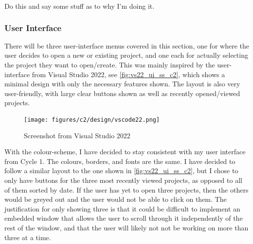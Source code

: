 \documentclass[11pt]{article}
\begin{document}
                Do this and say some stuff as to why I'm doing it.

            \subsubsection{User Interface}


                

                There will be three user-interface menus covered in this section, one for where the user decides to open a new or existing project, and one each for actually selecting the project they want to open/create. This was mainly inspired by the user-interface from Visual Studio 2022, see \autoref{fig:vs22_ui_ss_c2}, which shows a minimal design with only the necessary features shown. The layout is also very user-friendly, with large clear buttons shown as well as recently opened/viewed projects.

                \begin{figure}[!ht]
                    \centering
                    \texttt{[image: figures/c2/design/vscode22.png]}
                    \caption{Screenshot from Visual Studio 2022}
                    \label{fig:vs22_ui_ss_c2}
                \end{figure}

                With the colour-scheme, I have decided to stay consistent with my user interface from Cycle 1. The colours, borders, and fonts are the same. I have decided to follow a similar layout to the one shown in \autoref{fig:vs22_ui_ss_c2}, but I chose to only have buttons for the three most recently viewed projects, as opposed to all of them sorted by date. If the user has yet to open three projects, then the others would be greyed out and the user would not be able to click on them. The justification for only showing three is that it could be difficult to implement an embedded window that allows the user to scroll through it independently of the rest of the window, and that the user will likely not not be working on more than three at a time. 
\end{document}
